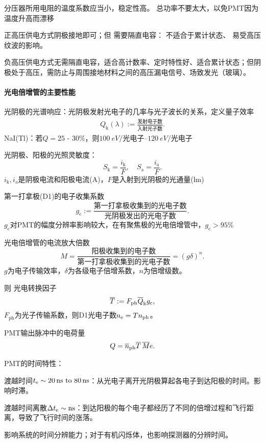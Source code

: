 分压器所用电阻的温度系数应当小，稳定性高。
总功率不要太大，以免PMT因为温度升高而漂移

正高压供电方式阴极接地即可；但
需要隔直电容：
不适合于累计状态、
易受高压纹波的影响。

负高压供电方式无需隔直电容，适合高计数率、定时特性好、适合累计状态；但阴极处于高压，需防止与周围接地材料之间的高压漏电信号、场致发光（玻璃）。
\paragraph{光电倍增管的主要性能}
\begin{compactitem}
	\item 光阴极的光谱响应：光阴极发射光电子的几率与光子波长的关系，定义量子效率
	\begin{align}
		Q_\mathrm k(\lambda):=\frac{\text{发射电子数}}{\text{入射光子数}}.
	\end{align}
	NaI(Tl)：若$Q=25$ - 30\%，则$\SIrange{100}{120}{eV/\text{光电子}}$
	\item 光阴极、阳极的光照灵敏度：
	\[
		S_\mathrm k=\frac{i_\mathrm k}F,\quad S_\mathrm a=\frac{i_\mathrm a}F.
	\]
	$i_\mathrm k,i_\mathrm a$是阴极电流和阳极电流(A)，$F$是入射到光阴极的光通量(lm)
	\item 第一打拿极(D1)的电子收集系数
	\[
		g_\mathrm c:=\frac{\text{第一打拿极收集到的光电子数}}{\text{光阴极发出的光电子数}}.
	\]
	$g_\mathrm c$对PMT的幅度分辨率影响较大，在有聚焦极的光电倍增管中，$g_\mathrm c>95\%$
	\item 光电倍增管的电流放大倍数
	\[
		M=\frac{\text{阳极收集到的电子数}}{\text{第一打拿极收集到的光电子数}}=(g\delta)^n.
	\]
	$g$为电子传输效率，$\delta$为各级电子倍增系数，$n$为倍增级数。
\end{compactitem}
则%
光电转换因子
\[
	\avg T:=F_{\mathrm{ph}}\avg Q_\mathrm kg_\mathrm c,
\]
$F_{\mathrm{ph}}$为光子传输系数，则D1光电子数$n_\elc=Tn_{\mathrm{ph}}$。

PMT输出脉冲中的电荷量
\begin{align}
	Q=\avg n_{\mathrm{ph}}\avg T\,\avg Me.
\end{align}
\begin{compactitem}
	\item PMT的时间特性：
	\begin{compactitem}
		\item 渡越时间$t_\elc\sim\SIrange{20}{80}{ns}$：从光电子离开光阴极算起各电子到达阳极的时间。影响时滞。
		\item 渡越时间离散$\D t_\elc\sim\si{ns}$：到达阳极的每个电子都经历了不同的倍增过程和飞行距离，导致了飞行时间的涨落。
		
		影响系统的时间分辨能力；对于有机闪烁体，也影响探测器的分辨时间。
	\end{compactitem}
\end{compactitem}
